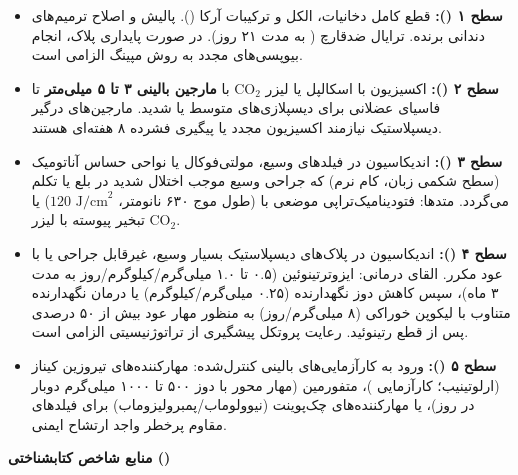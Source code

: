 \documentclass[a4paper]{article}
\begin{document}
\begin{itemize}
    \item \textbf{سطح ۱ ():} قطع کامل دخانیات، الکل و ترکیبات آرکا (). پالیش و اصلاح ترمیم‌های دندانی برنده. ترایال ضدقارچ ( به مدت ۲۱ روز). در صورت پایداری پلاک، انجام بیوپسی‌های مجدد به روش مپینگ الزامی است.
    \item \textbf{سطح ۲ ():} اکسیزیون با اسکالپل یا لیزر $\text{CO}_2$ با \textbf{مارجین بالینی ۳ تا ۵ میلی‌متر} تا فاسیای عضلانی برای دیسپلازی‌های متوسط یا شدید. مارجین‌های درگیر دیسپلاستیک نیازمند اکسیزیون مجدد یا پیگیری فشرده ۸ هفته‌ای هستند.
    \item \textbf{سطح ۳ ():} اندیکاسیون در فیلدهای وسیع، مولتی‌فوکال یا نواحی حساس آناتومیک (سطح شکمی زبان، کام نرم) که جراحی وسیع موجب اختلال شدید در بلع یا تکلم می‌گردد. متدها: فتودینامیک‌تراپی موضعی با  (طول موج ۶۳۰ نانومتر، $120\text{ J/cm}^2$) یا تبخیر پیوسته با لیزر $\text{CO}_2$.
    \item \textbf{سطح ۴ ():} اندیکاسیون در پلاک‌های دیسپلاستیک بسیار وسیع، غیرقابل جراحی یا با عود مکرر. القای درمانی: ایزوترتینوئین (۰.۵ تا ۱.۰ میلی‌گرم/کیلوگرم/روز به مدت ۳ ماه)، سپس کاهش دوز نگهدارنده (۰.۲۵ میلی‌گرم/کیلوگرم) یا درمان نگهدارنده متناوب با لیکوپن خوراکی (۸ میلی‌گرم/روز) به منظور مهار عود بیش از ۵۰ درصدی پس از قطع رتینوئید. رعایت پروتکل پیشگیری از تراتوژنیسیتی الزامی است.
    \item \textbf{سطح ۵ ():} ورود به کارآزمایی‌های بالینی کنترل‌شده: مهارکننده‌های تیروزین کیناز  (ارلوتینیب؛ کارآزمایی \href{https://pubmed.ncbi.nlm.nih.gov/27091708/}{})، متفورمین (مهار محور  با دوز ۵۰۰ تا ۱۰۰۰ میلی‌گرم دوبار در روز)، یا مهارکننده‌های چک‌پوینت  (نیوولوماب/پمبرولیزوماب) برای فیلدهای مقاوم پرخطر واجد ارتشاح ایمنی.
\end{itemize}

\vspace{5pt}
{\large\bfseries منابع شاخص کتابشناختی ()}
\vspace{2pt}
\end{document}
